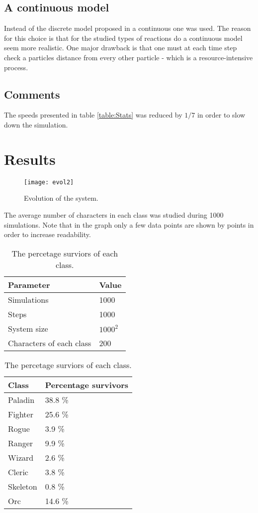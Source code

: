 \documentclass[a4paper,12pt]{article}
\begin{document}
\subsection{A continuous model}
Instead of the discrete model proposed in \cite{lecture_notes} a continuous one was used.
The reason for this choice is that for the studied types of reactions do a continuous model seem more realistic.
One major drawback is that one must at each time step check a particles distance from every other particle - which is a resource-intensive process.

\subsection{Comments}
The speeds presented in table \ref{table:Stats} was reduced by $1/7$ in order to slow down the simulation.


\newpage
\section{Results}\label{sec:Results}
\begin{figure}[h]
	\centering
	\texttt{[image: evol2]}
	\caption{Evolution of the system. \label{fig:Evolution}}
\end{figure}

\noindent
The average number of characters in each class was studied during 1000 simulations.
Note that in the graph only a few data points are shown by points in order to increase readability.

\begin{table}[H] 
	\parbox{.45\linewidth}{
	\centering
	\caption{The parameters used to generate the data.\label{table:Simulation_Settings}}
	\begin{tabular}{@{}ll@{}}
		\toprule
		Parameter & Value  \\ \midrule
		Simulations & 1000 \\
 		Steps & 1000 		\\
 		System size & $1000^2$ 	 \\
 		Characters of each class 	& 200 	\\ \bottomrule
	\end{tabular}
	}
	\hfill
	\parbox{.45\linewidth}{
	\centering
	\caption{The percetage surviors of each class.\label{table:Final}}
	\begin{tabular}{@{}ll@{}}
		\toprule
		Class 		& Percentage survivors  \\ \midrule
 		Paladin 	& 38.8 \%\\
 		Fighter 	& 25.6 \%\\
 		Rogue 		& 3.9 \%\\
 		Ranger 		& 9.9 \%\\
 		Wizard 		& 2.6 \%\\
 		Cleric 		& 3.8 \%\\
 		Skeleton 	& 0.8 \%\\
 		Orc 		& 14.6 \% 	\\ \bottomrule
	\end{tabular}
}
\end{table}
\end{document}
